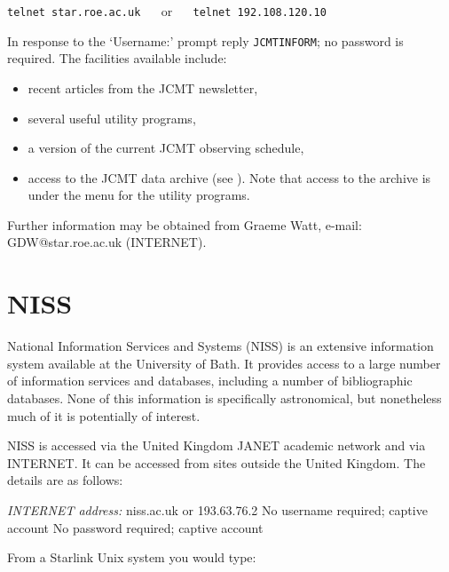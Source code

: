 \vspace{2.0 mm}
\verb:telnet star.roe.ac.uk: ~~ or ~~ \verb:telnet 192.108.120.10:
\vspace{2.0 mm}

In response to the `Username:' prompt reply {\tt JCMTINFORM}; no
password is required. The facilities available include:

\begin{itemize}

  \item recent articles from the JCMT newsletter,

  \item several useful utility programs,

  \item a version of the current JCMT observing schedule,

  \item access to the JCMT data archive (see ).
   Note that access
   to the archive is under the menu for the utility programs.

\end{itemize}

Further information may be obtained from Graeme Watt, e-mail:
GDW@star.roe.ac.uk
\newline (INTERNET).


\section{NISS
\label{NISS}}

National Information Services and Systems (NISS) is an extensive
information system available at the University of Bath. It provides
access to a large number of information services and databases,
including a number of bibliographic databases. None of this information
is specifically astronomical, but nonetheless much of it is potentially
of interest.

NISS is accessed via the United Kingdom JANET academic network and via
INTERNET. It can be accessed from sites outside the United Kingdom. The
details are as follows:

{\it INTERNET address:} niss.ac.uk or 193.63.76.2
 No username required; captive account
 No password required; captive account

From a Starlink Unix system you would type:

